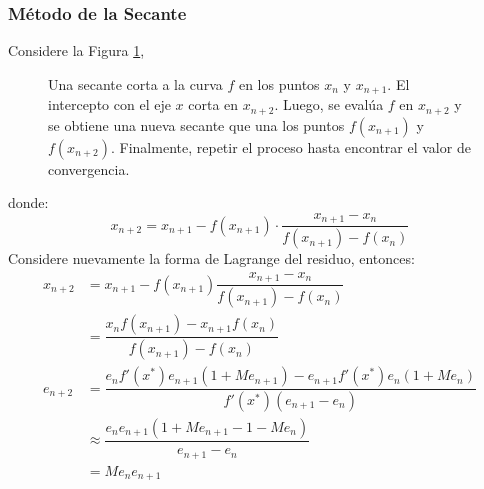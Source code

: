 \documentclass[english, spanish, fleqn, 10pt]{article}
\numberwithin{equation}{section}
\newcommand{\nparentesis}[1]{\left( #1 \right)}
\theoremstyle{definition}
\begin{document}
\subsubsection{Método de la Secante}
Considere la Figura \ref{02::secante:grafico}, 
\begin{figure}[!h]
	\centering
	\caption{Una secante corta a la curva $f$ en los puntos $x_n$ y $x_{n+1}$. El intercepto con el eje $x$ corta en $x_{n+2}$. Luego, se evalúa $f$ en $x_{n+2}$ y se obtiene una nueva secante que una los puntos $f\nparentesis{x_{n+1}}$ y $f\nparentesis{x_{n+2}}$. Finalmente, repetir el proceso hasta encontrar el valor de convergencia.}
	\label{02::secante:grafico}
\end{figure}
donde:
\begin{equation}
x_{n+2} = x_{n+1}-f\nparentesis{x_{n+1}}\cdot \dfrac{x_{n+1}-x_n}{f\nparentesis{x_{n+1}}-f\nparentesis{x_n}}
\end{equation}
Considere nuevamente la forma de Lagrange del residuo, entonces:
\begin{align*}
x_{n+2}&=x_{n+1}-f\nparentesis{x_{n+1}}\dfrac{x_{n+1}-x_n}{f\nparentesis{x_{n+1}}-f\nparentesis{x_n}}\\
&=\dfrac{x_nf\nparentesis{x_{n+1}}-x_{n+1}f\nparentesis{x_n}}{f\nparentesis{x_{n+1}}-f\nparentesis{x_n}}\\
e_{n+2}&=\dfrac{e_nf'\nparentesis{x^*}e_{n+1}\nparentesis{1+Me_{n+1}}-e_{n+1}f'\nparentesis{x^*}e_n\nparentesis{1+Me_n}}{f'\nparentesis{x^*}\nparentesis{e_{n+1}-e_n}}\\
&\approx \dfrac{e_ne_{n+1}\nparentesis{1+Me_{n+1}-1-Me_n}}{e_{n+1}-e_n}\\
&=Me_ne_{n+1}
\end{align*}
\end{document}
